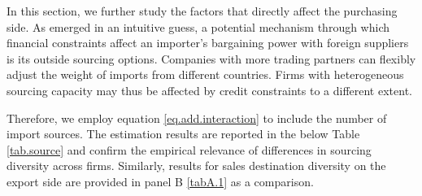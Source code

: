 \documentclass[12pt]{article}
\begin{document}
In this section, we further study the factors that directly affect the purchasing side. As emerged in an intuitive guess, a potential mechanism through which financial constraints affect an importer's bargaining power with foreign suppliers is its outside sourcing options. Companies with more trading partners can flexibly adjust the weight of imports from different countries. Firms with heterogeneous sourcing capacity may thus be affected by credit constraints to a different extent. 

Therefore, we employ equation \ref{eq.add.interaction} to include the number of import sources. The estimation results are reported in the below Table \ref{tab.source} and confirm the empirical relevance of differences in sourcing diversity across firms. Similarly, results for sales destination diversity on the export side are provided in panel B \ref{tabA.1} as a comparison.
\end{document}
